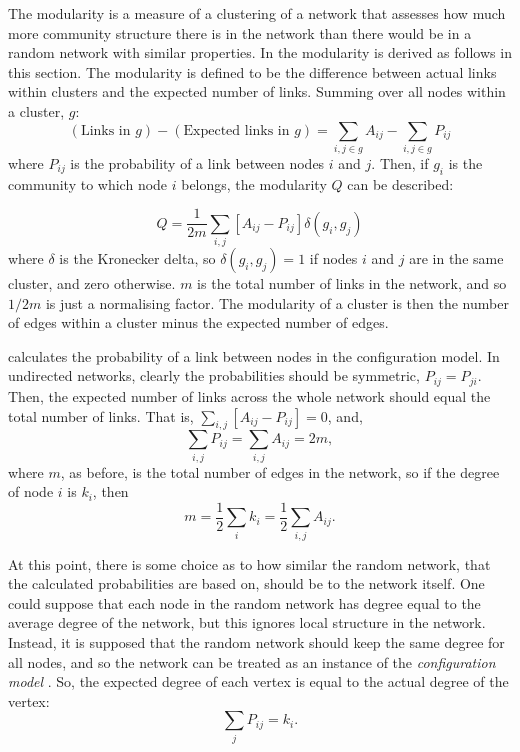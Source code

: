 The modularity is a measure of a clustering of a network that assesses 
how much more community structure there is in the network than there would be 
in a random network with similar properties.  In \citep{Newman2006b,Newman2006a} the modularity is derived as follows in this section. The modularity is defined to be the difference between actual links within clusters and the expected number of links.  Summing over all nodes within a cluster, $g$:
\begin{equation}
(\text{Links in }g) - (\text{Expected links in }g) = \sum_{i,j \in g}  A_{ij} - \sum_{i,j \in g} P_{ij} 
\end{equation}
where $P_{ij}$ is the 
probability of a link between nodes $i$ and $j$. Then, if $g_i$ is the 
community to which node $i$ belongs, the modularity $Q$ can be described:

\begin{equation}
Q = \frac{1}{2m}\sum_{i,j}[A_{ij} - P_{ij}]\delta(g_i,g_j)
\end{equation}
where $\delta$ is the Kronecker delta, so $\delta(g_i,g_j)=1$ if nodes 
$i$ and $j$ are in the same cluster, and zero otherwise. $m$ is the total 
number of links in the network, and so $1/2m$ is just a normalising 
factor.  The modularity of a cluster is then the number of edges within a 
cluster minus the expected number of edges.

\citet{Newman2006b,Newman2006a} calculates the probability of a link between nodes in the configuration model.  In undirected networks, 
clearly the probabilities should be symmetric, $P_{ij} = P_{ji}$.  Then, the expected number of links across the whole network should equal the total number of links.   That is, $\sum_{i,j}[A_{ij} - P_{ij}] = 0$, and,
\begin{equation}
\sum_{i,j}P_{ij} = \sum_{i,j} A_{ij} = 2m,
\end{equation}
where $m$, as before, is the total number of edges in the network, so if the 
degree of node $i$ is $k_i$, then
\begin{equation}
m = \frac{1}{2}\sum_i k_i = \frac{1}{2}\sum_{i,j} A_{ij}.
\end{equation}

At this point, there is some choice as to how similar the random network, that the calculated probabilities are based on, should be to the network itself.  One could suppose that each node 
in the random network has degree equal to the average degree of the 
network, but this ignores local structure in the network.  Instead, it is supposed that 
the random network should keep the same degree for all nodes, and so the network can be treated as an instance of the \emph{configuration model} \citep{BenderCanfield1978a, Bollobas1980a}.  So, the expected 
degree of each vertex is equal to the actual degree of the vertex:
\begin{equation}
\sum_j P_{ij} = k_i.
\label{probki}
\end{equation}

